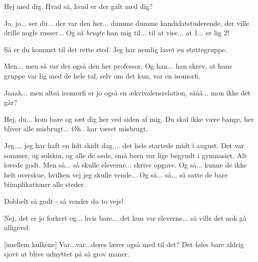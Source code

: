 \documentclass[a4paper,11pt]{article}
\begin{document}
\begin{sketch}


  Hej med dig. Hvad så, hvad er der galt med dig?

 Jo, jo... ser du... der var den her... dumme dumme kandidatstuderende, der ville drille nogle russer... Og så \emph{brugte} han mig til... til at vise... at 1... er lig 2! 

 Så er du kommet til det rette sted. Jeg har nemlig lavet en støttegruppe.

  Men... men så var der også den her professor. Og han... han skrev, at hans gruppe var lig med de hele tal, selv om det kun, var en isomorfi. 

 Jaaah... men altså isomorfi er jo også en ækvivalensrelation, sååå... mon ikke det går?



 Hej, du... kom bare og sæt dig her ved siden af mig. Du skal ikke være bange, her bliver alle misbrugt... Øh.. har været misbrugt.


 Jeg.... jeg har haft en lidt skidt dag.... det hele startede midt i august. Det var sommer, og solskin, og alle de søde, små børn var lige begyndt i gymnasiet. Alt lovede godt. Men så... så skulle eleverne... skrive opgave. Og så... kunne de ikke helt overskue, hvilken vej jeg skulle vende... Og så... så... så satte de bare biimplikationer alle steder.

 Dobbelt så godt - så vender du to veje! 

  Nej, det er jo forkert og... hvis bare... det kun var eleverne... så ville det nok gå alligevel. 

[imellem hulkene] Var...var...deres lærer også med til det? Det føles bare aldrig sjovt at blive udnyttet på så grov maner. 


\end{sketch}
\end{document}
